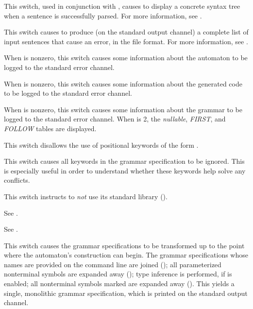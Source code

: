 \documentclass[onecolumn,11pt,nocopyrightspace,preprint]{sigplanconf}
\begin{document}
\docswitch{\ointerpretshowcst} This switch, used in conjunction with \ointerpret,
causes \menhir to display a concrete syntax tree when a sentence is successfully
parsed. For more information, see .

\docswitch{\olisterrors} This switch causes \menhir to produce (on the standard
output channel) a complete list of input sentences that cause an error, in the
\messages file format. For more information, see .

 When  is nonzero, this switch
causes some information about the automaton to be logged to the standard error
channel.

 When  is nonzero, this switch
causes some information about the generated \ocaml code to be logged to the
standard error channel.

 When  is nonzero, this switch
causes some information about the grammar to be logged to the standard error
channel. When  is 2, the \emph{nullable}, \emph{FIRST}, and
\emph{FOLLOW} tables are displayed.

\docswitch{\onodollars} This switch disallows the use of positional keywords
of the form .

\docswitch{\onoinline} This switch causes all \dinline keywords in the
grammar specification to be ignored. This is especially useful in order
to understand whether these keywords help solve any conflicts.

\docswitch{\onostdlib} This switch instructs \menhir to \emph{not} use
its standard library ().

 See .

 See .

\docswitch{\oonlypreprocess} This switch causes the grammar specifications
to be transformed up to the point where the automaton's construction can
begin. The grammar specifications whose names are provided on the command line
are joined (); all parameterized nonterminal symbols are
expanded away (); type inference is performed, if \oinfer
is enabled; all nonterminal symbols marked \dinline are expanded away
(). This yields a single, monolithic grammar specification,
which is printed on the standard output channel.
\end{document}
